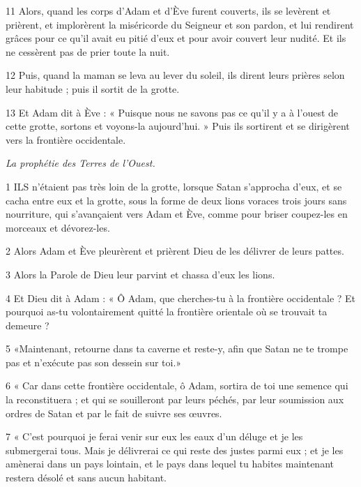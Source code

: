 \par 11 Alors, quand les corps d'Adam et d'Ève furent couverts, ils se levèrent et prièrent, et implorèrent la miséricorde du Seigneur et son pardon, et lui rendirent grâces pour ce qu'il avait eu pitié d'eux et pour avoir couvert leur nudité. Et ils ne cessèrent pas de prier toute la nuit.

\par 12 Puis, quand la maman se leva au lever du soleil, ils dirent leurs prières selon leur habitude ; puis il sortit de la grotte.

\par 13 Et Adam dit à Ève : « Puisque nous ne savons pas ce qu'il y a à l'ouest de cette grotte, sortons et voyons-la aujourd'hui. » Puis ils sortirent et se dirigèrent vers la frontière occidentale.




\par \textit{La prophétie des Terres de l'Ouest.}

\par 1 ILS n'étaient pas très loin de la grotte, lorsque Satan s'approcha d'eux, et se cacha entre eux et la grotte, sous la forme de deux lions voraces trois jours sans nourriture, qui s'avançaient vers Adam et Ève, comme pour briser coupez-les en morceaux et dévorez-les.

\par 2 Alors Adam et Ève pleurèrent et prièrent Dieu de les délivrer de leurs pattes.

\par 3 Alors la Parole de Dieu leur parvint et chassa d'eux les lions.

\par 4 Et Dieu dit à Adam : « Ô Adam, que cherches-tu à la frontière occidentale ? Et pourquoi as-tu volontairement quitté la frontière orientale où se trouvait ta demeure ?

\par 5 «Maintenant, retourne dans ta caverne et reste-y, afin que Satan ne te trompe pas et n'exécute pas son dessein sur toi.»

\par 6 « Car dans cette frontière occidentale, ô Adam, sortira de toi une semence qui la reconstituera ; et qui se souilleront par leurs péchés, par leur soumission aux ordres de Satan et par le fait de suivre ses œuvres.

\par 7 « C'est pourquoi je ferai venir sur eux les eaux d'un déluge et je les submergerai tous. Mais je délivrerai ce qui reste des justes parmi eux ; et je les amènerai dans un pays lointain, et le pays dans lequel tu habites maintenant restera désolé et sans aucun habitant.

